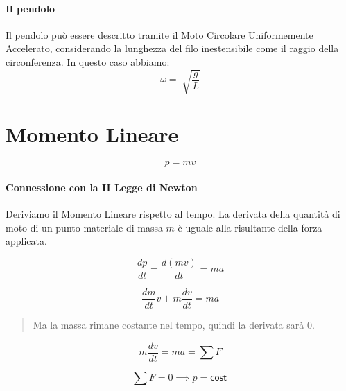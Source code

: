         \paragraph{Il pendolo} Il pendolo può essere descritto tramite il
        Moto Circolare Uniformemente Accelerato, considerando la lunghezza del 
        filo inestensibile come il raggio della circonferenza. In questo caso 
        abbiamo:
        \begin{equation*}
            \omega = \sqrt[]{\frac{g}{L}}
        \end{equation*}
    
    
    
    \section{Momento Lineare}

        \begin{equation}
            p = mv
        \end{equation}

        \paragraph{Connessione con la II Legge di Newton} Deriviamo il 
        Momento Lineare rispetto al tempo. La derivata della quantità di moto di
        un punto materiale di massa $m$ è uguale alla risultante della forza 
        applicata.

        \begin{equation*}
            \frac{dp}{dt} = \frac{d(mv)}{dt} = ma
        \end{equation*}

        \begin{equation*}
            \frac{dm}{dt} v + m \frac{dv}{dt} = ma
        \end{equation*}

        \begin{quote}
            Ma la massa rimane costante nel tempo, quindi la derivata sarà 0.
        \end{quote}

        \begin{equation*}
            m\frac{dv}{dt} = ma = \sum F
        \end{equation*}

        \begin{equation*}
            \sum F = 0 \implies p = \textsf{cost}\
        \end{equation*}


